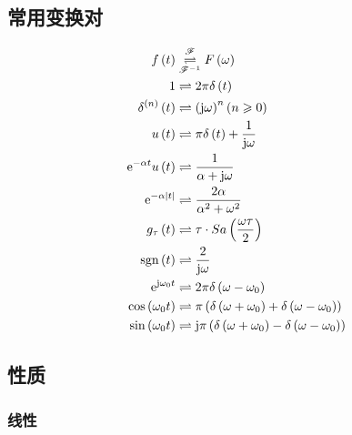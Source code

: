 \documentclass{article}
\begin{document}
\subsection{常用变换对}

\[\begin{aligned}
        f\left(t\right)                       & \overset{\mathscr F}{\underset{\mathscr F^{-1}}\rightleftharpoons}F\left(\omega\right)         \\
        1                         & \rightleftharpoons 2\pi\delta\left(t\right)                                                    \\
        \delta^{\left(n\right)}\left(t\right) & \rightleftharpoons \left(\mathrm j\omega\right)^n\left(n\geqslant0\right)                                   \\
        u\left(t\right)                 & \rightleftharpoons \pi\delta\left(t\right)+\frac1{\mathrm j\omega}                                    \\
        \mathrm e^{-\alpha t}u\left(t\right)   & \rightleftharpoons \frac1{\alpha+\mathrm j\omega}                                               \\
        \mathrm e^{-\alpha\left|t\right|}        & \rightleftharpoons \frac{2\alpha}{\alpha^2+\omega^2}                                     \\
        g_\tau\left(t\right)            & \rightleftharpoons \tau\cdot Sa\left(\frac{\omega\tau}2\right)                                 \\
        \mathrm{sgn}\left(t\right)      & \rightleftharpoons \frac2{\mathrm j\omega}                                                      \\
        \mathrm e^{\mathrm j\omega_0t}          & \rightleftharpoons 2\pi\delta\left(\omega-\omega_0\right)                                      \\
        \cos\left(\omega_0 t\right)     & \rightleftharpoons \pi\left(\delta\left(\omega+\omega_0\right)+\delta\left(\omega-\omega_0\right)\right)   \\
        \sin\left(\omega_0 t\right)     & \rightleftharpoons \mathrm j\pi\left(\delta\left(\omega+\omega_0\right)-\delta\left(\omega-\omega_0\right)\right)
    \end{aligned}\]

\subsection{性质}

\subsubsection{线性}
\end{document}
